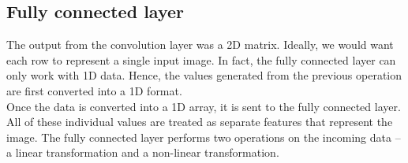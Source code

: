 \subsection{Fully connected layer}
The output from the convolution layer was a 2D matrix. Ideally, we would want each row to represent a single input image. In fact, the fully connected layer can only work with 1D data. Hence, the values generated from the previous operation are first converted into a 1D format.\\
Once the data is converted into a 1D array, it is sent to the fully connected layer. All of these individual values are treated as separate features that represent the image. The fully connected layer performs two operations on the incoming data – a linear transformation and a non-linear transformation.\\

